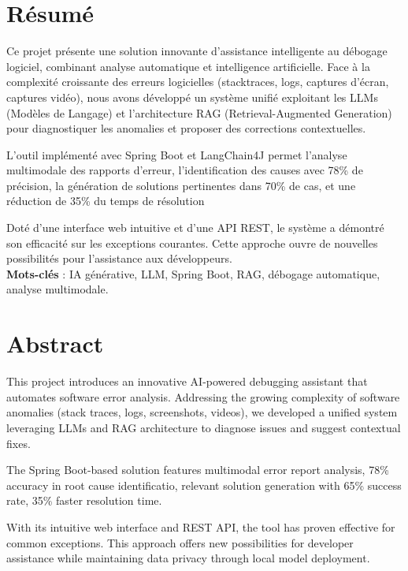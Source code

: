 \documentclass[12pt,a4paper]{report}
\begin{document}
	\clearpage
	\chapter*{Résumé}
	
	Ce projet présente une solution innovante d'assistance intelligente au débogage logiciel, combinant analyse automatique et intelligence artificielle. Face à la complexité croissante des erreurs logicielles (stacktraces, logs, captures d'écran, captures vidéo), nous avons développé un système unifié exploitant les LLMs (Modèles de Langage) et l'architecture RAG (Retrieval-Augmented Generation) pour diagnostiquer les anomalies et proposer des corrections contextuelles.
	
	L'outil implémenté avec Spring Boot et LangChain4J permet l'analyse multimodale des rapports d'erreur, l'identification des causes avec 78\% de précision, la génération de solutions pertinentes dans 70\% de cas, et une réduction de 35\% du temps de résolution
	
	Doté d'une interface web intuitive et d'une API REST, le système a démontré son efficacité sur les exceptions courantes. Cette approche ouvre de nouvelles possibilités pour l'assistance aux développeurs.\\[15em]
	
	\textbf{Mots-clés} : IA générative, LLM, Spring Boot, RAG, débogage automatique, analyse multimodale.

	\clearpage
	\chapter*{Abstract}
	
	This project introduces an innovative AI-powered debugging assistant that automates software error analysis. Addressing the growing complexity of software anomalies (stack traces, logs, screenshots, videos), we developed a unified system leveraging LLMs and RAG architecture to diagnose issues and suggest contextual fixes.
	
	The Spring Boot-based solution features multimodal error report analysis, 78\% accuracy in root cause identificatio, relevant solution generation with 65\% success rate, 35\% faster resolution time.
	
	With its intuitive web interface and REST API, the tool has proven effective for common exceptions. This approach offers new possibilities for developer assistance while maintaining data privacy through local model deployment.\\[18em]
	
\end{document}
